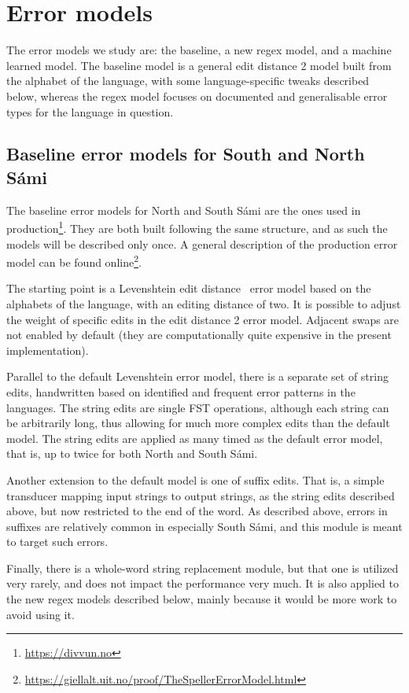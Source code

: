 \documentclass{flammie}
\begin{document}
\section{Error models}

The error models we study are: the baseline, a new regex model, and a machine
learned model. The baseline model is a general edit distance 2 model built from
the alphabet of the language, with some language-specific tweaks described
below, whereas the regex model focuses on documented and generalisable error
types for the language in question.

\subsection{Baseline error models for South and North Sámi}

The baseline error models for North and South Sámi are the ones used in
production\footnote{\url{https://divvun.no}}. They are both built following the
same structure, and as such the models will be described only once. A general
description of the production error model can be found
online\footnote{\url{https://giellalt.uit.no/proof/TheSpellerErrorModel.html}}.

The starting point is a Levenshtein edit distance~\cite{levenshtein1966binary}
error model based on the alphabets of the language, with an editing distance of
two. It is possible to adjust the weight of specific edits in the edit distance
2 error model. Adjacent swaps are not enabled by default (they are
computationally quite expensive in the present implementation).

Parallel to the default Levenshtein error model, there is a separate set of
string edits, handwritten based on identified and frequent error patterns in the
languages. The string edits are single FST operations, although each string can
be arbitrarily long, thus allowing for much more complex edits than the default
model. The string edits are applied as many timed as the default error model,
that is, up to twice for both North and South Sámi.

Another extension to the default model is one of suffix edits. That is, a simple
transducer mapping input strings to output strings, as the string edits
described above, but now restricted to the end of the word. As described above,
errors in suffixes are relatively common in especially South Sámi, and this
module is meant to target such errors.

Finally, there is a whole-word string replacement module, but that one is
utilized very rarely, and does not impact the performance very much. It is also
applied to the new regex models described below, mainly because it would be more
work to avoid using it.
\end{document}
